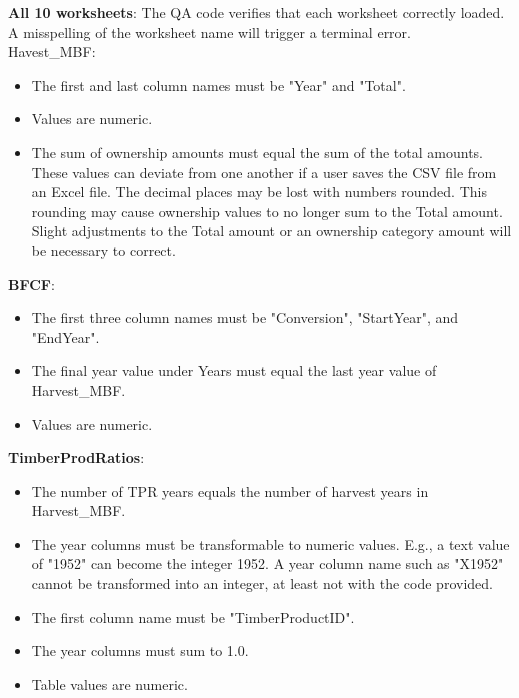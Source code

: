 \documentclass[
  openany]{book}
\providecommand{\tightlist}{%
  \setlength{\itemsep}{0pt}\setlength{\parskip}{0pt}}
\begin{document}
\textbf{All 10 worksheets}: The QA code verifies that each worksheet correctly loaded. A misspelling of the worksheet name will trigger a terminal error.\\
Havest\_MBF:

\begin{itemize}
\tightlist
\item
  The first and last column names must be "Year" and "Total".\\
\item
  Values are numeric.\\
\item
  The sum of ownership amounts must equal the sum of the total amounts. These values can deviate from one another if a user saves the CSV file from an Excel file. The decimal places may be lost with numbers rounded. This rounding may cause ownership values to no longer sum to the Total amount. Slight adjustments to the Total amount or an ownership category amount will be necessary to correct.
\end{itemize}

\textbf{BFCF}:

\begin{itemize}
\tightlist
\item
  The first three column names must be "Conversion", "StartYear", and "EndYear".\\
\item
  The final year value under Years must equal the last year value of Harvest\_MBF.\\
\item
  Values are numeric.
\end{itemize}

\textbf{TimberProdRatios}:

\begin{itemize}
\tightlist
\item
  The number of TPR years equals the number of harvest years in Harvest\_MBF.\\
\item
  The year columns must be transformable to numeric values. E.g., a text value of "1952" can become the integer 1952. A year column name such as "X1952" cannot be transformed into an integer, at least not with the code provided.\\
\item
  The first column name must be "TimberProductID".\\
\item
  The year columns must sum to 1.0.\\
\item
  Table values are numeric.
\end{itemize}
\end{document}
